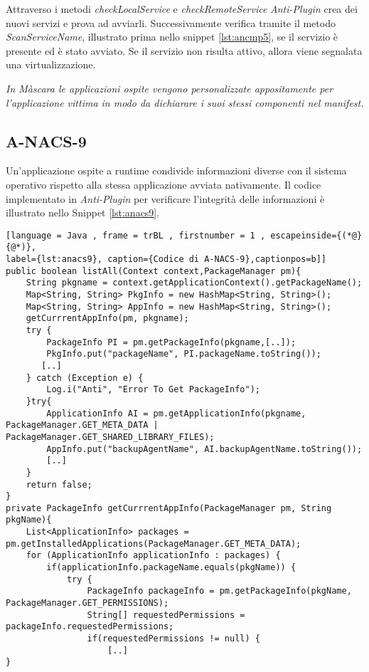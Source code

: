 Attraverso i metodi \emph{checkLocalService} e \emph{checkRemoteService} \emph{Anti-Plugin} crea dei nuovi servizi e prova ad avviarli. Successivamente verifica tramite il metodo \emph{ScanServiceName}, illustrato prima nello snippet \ref{lst:ancmp5}, se il servizio è presente ed è stato avviato.
Se il servizio non risulta attivo, allora viene segnalata una virtualizzazione.

\emph{In Màscara le applicazioni ospite vengono personalizzate appositamente per l'applicazione vittima in modo da dichiarare i suoi stessi componenti nel manifest.}

\newpage
\subsection*{A-NACS-9}
\label{a-nacs-9}

Un'applicazione ospite a runtime condivide informazioni diverse con il sistema operativo rispetto alla stessa applicazione avviata nativamente.
Il codice implementato in \emph{Anti-Plugin} per verificare l'integrità delle informazioni è illustrato nello Snippet \ref{lst:anacs9}.

\begin{lstlisting}[language = Java , frame = trBL , firstnumber = 1 , escapeinside={(*@}{@*)},
label={lst:anacs9}, caption={Codice di A-NACS-9},captionpos=b]]
public boolean listAll(Context context,PackageManager pm){
    String pkgname = context.getApplicationContext().getPackageName();
    Map<String, String> PkgInfo = new HashMap<String, String>();
    Map<String, String> AppInfo = new HashMap<String, String>();
    getCurrrentAppInfo(pm, pkgname);
    try {
        PackageInfo PI = pm.getPackageInfo(pkgname,[..]);
        PkgInfo.put("packageName", PI.packageName.toString());
       [..]
    } catch (Exception e) {
        Log.i("Anti", "Error To Get PackageInfo");
    }try{
        ApplicationInfo AI = pm.getApplicationInfo(pkgname, PackageManager.GET_META_DATA | PackageManager.GET_SHARED_LIBRARY_FILES);
        AppInfo.put("backupAgentName", AI.backupAgentName.toString());
        [..]
    }
    return false;
}
private PackageInfo getCurrrentAppInfo(PackageManager pm, String pkgName){
    List<ApplicationInfo> packages = pm.getInstalledApplications(PackageManager.GET_META_DATA);
    for (ApplicationInfo applicationInfo : packages) {
        if(applicationInfo.packageName.equals(pkgName)) {
            try {
                PackageInfo packageInfo = pm.getPackageInfo(pkgName, PackageManager.GET_PERMISSIONS);
                String[] requestedPermissions = packageInfo.requestedPermissions;
                if(requestedPermissions != null) {
                    [..]
}
\end{lstlisting}

